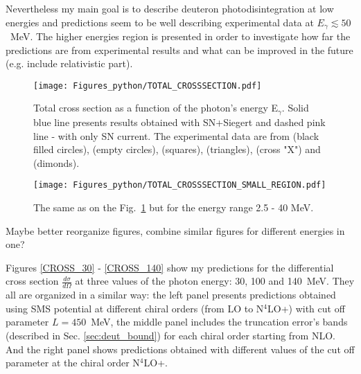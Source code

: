     Nevertheless my main goal is to describe deuteron photodisintegration at low energies and predictions seem to be well describing experimental data at
    $E_\gamma \lesssim 50$~MeV. The higher energies region is presented in order
    to investigate how far the predictions are from experimental results and 
    what can be improved in the future (e.g. include relativistic part). 

    
    \begin{figure}[h]
        \begin{center}
        \texttt{[image: Figures\_python/TOTAL\_CROSSSECTION.pdf]}
        \end{center}
        \caption{Total cross section as a function of the photon's energy E$_\gamma$.
        Solid blue line presents results obtained with SN+Siegert 
        and dashed pink line - with only SN current.
        The experimental data are from \cite{Bernabei1986} (black filled circles),
        \cite{BOSMAN1979} (empty circles),
        \cite{ARENDS1984} (squares),
        \cite{Skopik1974} (triangles),
        \cite{Moreh1989} (cross "X") and
        \cite{Birenbaum1985} (dimonds).
        }
        \label{TOTAL_CROSS}
    \end{figure}
    

    \begin{figure}[h]
        \begin{center}
        \texttt{[image: Figures\_python/TOTAL\_CROSSSECTION\_SMALL\_REGION.pdf]}
        \end{center}
        \caption{The same as on the Fig.~\ref{TOTAL_CROSS} but for the energy range 2.5 - 40 MeV.
        }
        \label{TOTAL_CROSS_small}
    \end{figure}
        
    {\color{red} Maybe better reorganize figures, combine similar figures for different energies in one?}

    Figures \ref{CROSS_30} - \ref{CROSS_140} show my predictions for the differential cross section
    $\frac{d\sigma}{d\Omega}$ at three values of the photon energy:
    30, 100 and 140~MeV. They all are organized in a similar way: the left panel
    presents predictions obtained using SMS potential at different chiral orders (from LO to N$^4$LO+)
    with cut off parameter $L = 450$~MeV,
    the middle panel includes the truncation error's bands (described in Sec. \ref{sec:deut_bound})
    for each chiral order starting
    from NLO. And the right panel shows predictions obtained with different values of the
    cut off parameter at the chiral order N$^4$LO+.

